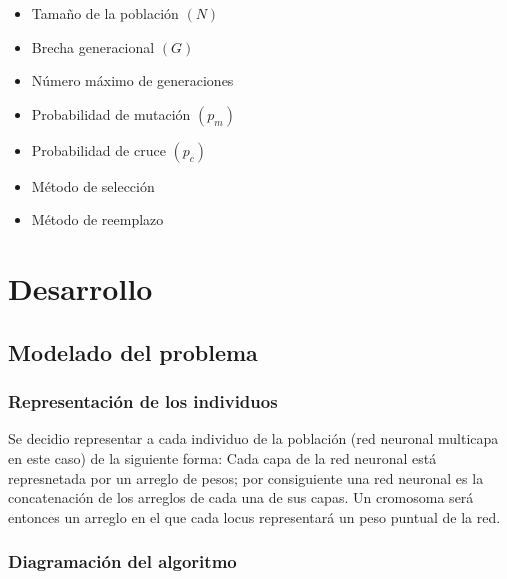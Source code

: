 \documentclass[%
    final,
    reprint,
    notitlepage,
    narroweqnarray,
    inline,
    twoside,
    invited
    ]{ieee}
\begin{document}
\begin{itemize} 
\item Tamaño de la población $(N)$
\item Brecha generacional $(G)$
\item Número máximo de generaciones
\item Probabilidad de mutación $(p_m)$
\item Probabilidad de cruce $(p_c)$
\item Método de selección
\item Método de reemplazo
\end{itemize} 



\section{Desarrollo}

\subsection{Modelado del problema}

\subsubsection{Representación de los individuos}

\par Se decidio representar a cada individuo de la población (red neuronal multicapa en este caso) de la siguiente forma: Cada capa de la red neuronal está represnetada por un arreglo de pesos; por consiguiente una red neuronal es la concatenación de los arreglos de cada una de sus capas. Un cromosoma será entonces un arreglo en el que cada locus representará un peso puntual de la red.

\subsubsection{Diagramación del algoritmo}
\end{document}

